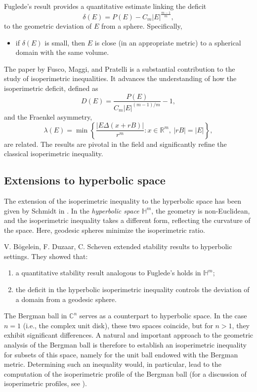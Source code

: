 \documentclass[11pt]{amsart}
\numberwithin{equation}{section}
\begin{document}
Fuglede's result provides a quantitative estimate linking the deficit
\[
\delta(E) = P(E) - C_m |E|^{\frac{m-1}{m}},
\]
to the geometric deviation of \( E\) from a sphere. Specifically,
\begin{itemize}
    \item if \( \delta(E) \) is small, then \(E \) is close (in an appropriate metric) to a spherical domain with the same volume.
\end{itemize}

The paper \cite{nicola} by Fusco, Maggi, and Pratelli is a substantial contribution to the study of isoperimetric inequalities. It advances the understanding of how the isoperimetric deficit, defined as
\[
D(E) = \frac{P(E)}{C_m |E|^{(m-1)/m}} - 1,
\]
and the Fraenkel asymmetry,
\[
\lambda(E) = \min \left\{ \frac{|E \Delta (x + rB)|}{r^m} : x \in \mathbb{R}^m, \ |rB| = |E| \right\},
\]
are related. The results are pivotal in the field and significantly refine the classical isoperimetric inequality.

\subsection*{Extensions to hyperbolic space}
The extension of the isoperimetric inequality to the hyperbolic space has been given by Schmidt in \cite{14}.
In the \textit{hyperbolic space \( \mathbb{H}^m \)}, the geometry is non-Euclidean, and the isoperimetric inequality takes a different form, reflecting the curvature of the space. Here, geodesic spheres minimize the isoperimetric ratio.

V. B\"ogelein, F. Duzaar, C. Scheven \cite{duzzar} extended stability results to hyperbolic settings. They showed that:
\begin{enumerate}
    \item a quantitative stability result analogous to Fuglede's holds in \( \mathbb{H}^m \);
    \item the deficit in the hyperbolic isoperimetric inequality controls the deviation of a domain from a geodesic sphere.
\end{enumerate}

The Bergman ball in \(\mathbb{C}^n\) serves as a counterpart to hyperbolic space. In the case \(n = 1\) (i.e., the complex unit disk), these two spaces coincide, but for \(n > 1\), they exhibit significant differences.
A natural and important approach to the geometric analysis of the Bergman ball is therefore to establish an isoperimetric inequality for subsets of this space, namely for the unit ball endowed with the Bergman metric.
Determining such an inequality would, in particular, lead to the computation of the isoperimetric profile of the Bergman ball (for a discussion of isoperimetric profiles, see \cite{ritore}).
\end{document}
